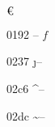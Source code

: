 \documentclass[11pt]{article}
\begin{document}
$\mbox{\texteuro}$


















0192 \textflorin -- \ensuremath{f}

0237 \j -- 

02c6 \textasciicircum -- 

02dc \textasciitilde -- \texttildelow












\end{document}
